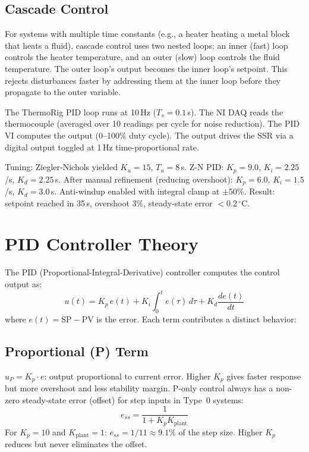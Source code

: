 \documentclass[11pt,letterpaper,twoside,openany]{book}
\newcommand{\degC}{\ensuremath{{}^{\circ}\text{C}}}
\begin{document}
\subsection{Cascade Control}
For systems with multiple time constants (e.g., a heater heating a metal block that heats a fluid), cascade control uses two nested loops: an inner (fast) loop controls the heater temperature, and an outer (slow) loop controls the fluid temperature. The outer loop's output becomes the inner loop's setpoint. This rejects disturbances faster by addressing them at the inner loop before they propagate to the outer variable.

\begin{examplebox}
The ThermoRig PID loop runs at 10\,Hz ($T_s = 0.1$\,s). The NI DAQ reads the thermocouple (averaged over 10 readings per cycle for noise reduction). The PID VI computes the output (0--100\% duty cycle). The output drives the SSR via a digital output toggled at 1\,Hz time-proportional rate.

Tuning: Ziegler-Nichols yielded $K_u = 15$, $T_u = 8$\,s. Z-N PID: $K_p = 9.0$, $K_i = 2.25$/s, $K_d = 2.25$\,s. After manual refinement (reducing overshoot): $K_p = 6.0$, $K_i = 1.5$/s, $K_d = 3.0$\,s. Anti-windup enabled with integral clamp at $\pm$50\%. Result: setpoint reached in 35\,s, overshoot 3\%, steady-state error $<$0.2\,\degC{}.
\end{examplebox}


\section{PID Controller Theory}
The PID (Proportional-Integral-Derivative) controller computes the control output as:
\begin{equation}
u(t) = K_p \, e(t) + K_i \int_0^t e(\tau)\,d\tau + K_d \frac{de(t)}{dt}
\end{equation}
where $e(t) = \text{SP} - \text{PV}$ is the error. Each term contributes a distinct behavior:

\subsection{Proportional (P) Term}
$u_P = K_p \cdot e$: output proportional to current error. Higher $K_p$ gives faster response but more overshoot and less stability margin. P-only control always has a non-zero steady-state error (offset) for step inputs in Type~0 systems:
\begin{equation}
e_{ss} = \frac{1}{1 + K_p K_{\text{plant}}}
\end{equation}
For $K_p = 10$ and $K_{\text{plant}} = 1$: $e_{ss} = 1/11 \approx 9.1\%$ of the step size. Higher $K_p$ reduces but never eliminates the offset.
\end{document}
